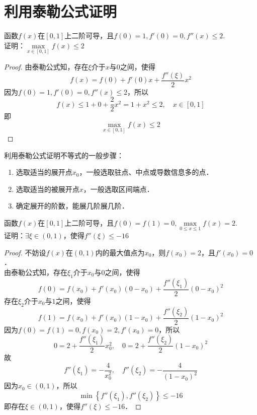\documentclass[12pt, a4paper, oneside, UTF8]{ctexbook}
\begin{document}
\section{利用泰勒公式证明}
\begin{example}
    函数$f(x)$在$[0,1]$上二阶可导，且$f(0)=1,f'(0)=0,f''(x) \le 2$.\\
    证明：$\max\limits_{x \in [0,1]} f(x) \le 2$
\end{example}
\begin{proof}
    由泰勒公式知，存在$\xi$介于$x$与$0$之间，使得
    \[
        f(x)=f(0) + f'(0)x + \frac{f''(\xi)}{2}x^2
    \]
    因为$f(0)=1,f'(0)=0,f''(x) \le 2$，所以
    \[
        f(x) \le 1 + 0 + \frac{2}{2}x^2 = 1 + x^2 \le 2, \quad x \in [0,1]
    \]
    即
    \[
        \max_{x \in [0,1]} f(x) \le 2
    \]
\end{proof}
\begin{myRemark}
    利用泰勒公式证明不等式的一般步骤：
    \begin{enumerate}\color {Blue}
        \item 选取适当的展开点$x_0$，一般选取驻点、中点或导数信息多的点．
        \item 选取适当的被展开点$x$，一般选取区间端点．
        \item 确定展开的阶数，能展几阶展几阶．
    \end{enumerate}
\end{myRemark}
\begin{example}
    函数$f(x)$在$[0,1]$上二阶可导，且$f(0)=f(1)=0,\max\limits_{0 \le x \le 1}f(x) = 2$.\\
    证明：$\exists \xi \in (0,1)$，使得$f''(\xi) \le -16$
\end{example}
\begin{proof}
    不妨设$f(x)$在$(0,1)$内的最大值点为$x_0$，则$f(x_0)=2$，且$f'(x_0)=0$．\\
    由泰勒公式知，存在$\xi_1$介于$x_0$与$0$之间，使得
    \[
        f(0)=f(x_0) + f'(x_0)(0 - x_0) + \frac{f''(\xi_1)}{2}(0 - x_0)^2
    \]
    存在$\xi_2$介于$x_0$与$1$之间，使得
    \[
        f(1)=f(x_0) + f'(x_0)(1 - x_0) + \frac{f''(\xi_2)}{2}(1 - x_0)^2
    \]
    因为$f(0)=f(1)=0,f(x_0)=2,f'(x_0)=0$，所以
    \[
        0=2 + \frac{f''(\xi_1)}{2}x_0^2, \quad 0=2 + \frac{f''(\xi_2)}{2}(1 - x_0)^2
    \]
    故
    \[
        f''(\xi_1) = -\frac{4}{x_0^2}, \quad f''(\xi_2) = -\frac{4}{(1 - x_0)^2}
    \]
    因为$x_0 \in (0,1)$，所以
    \[
        \min\left\{f''(\xi_1), f''(\xi_2)\right\} \le -16
    \]
    即存在$\xi \in (0,1)$，使得$f''(\xi) \le -16$．
\end{proof}
\end{document}
